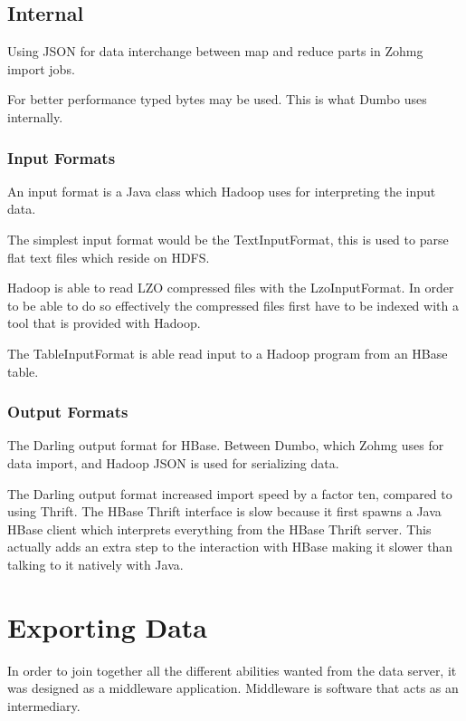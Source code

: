 \subsection*{Internal}

Using JSON for data interchange between map and reduce parts in Zohmg import
jobs.

For better performance typed bytes may be used. This is what Dumbo uses
internally.


\subsubsection{Input Formats}

An input format is a Java class which Hadoop uses for interpreting the input
data.

The simplest input format would be the TextInputFormat, this is used to parse
flat text files which reside on HDFS.

Hadoop is able to read LZO compressed files with the LzoInputFormat. In order to
be able to do so effectively the compressed files first have to be indexed with
a tool that is provided with Hadoop.

The TableInputFormat is able read input to a Hadoop program from an HBase table.


\subsubsection{Output Formats}

The Darling output format for HBase. Between Dumbo, which Zohmg uses for data
import, and Hadoop JSON is used for serializing data.

The Darling output format increased import speed by a factor ten, compared to
using Thrift. The HBase Thrift interface is slow because it first spawns a Java
HBase client which interprets everything from the HBase Thrift server.
This actually adds an extra step to the interaction with HBase making it slower
than talking to it natively with Java.


\section{Exporting Data}

In order to join together all the different abilities wanted from the data
server, it was designed as a middleware application. Middleware is software
that acts as an intermediary.

